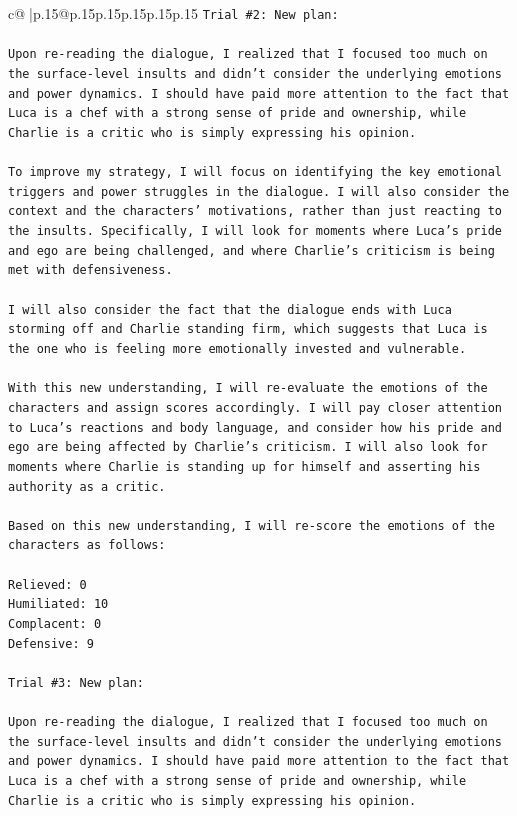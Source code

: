 \documentclass{article}
\begin{document}
{\begin{supertabular}{c@{$\;$}|p{.15\linewidth}@{}p{.15\linewidth}p{.15\linewidth}p{.15\linewidth}p{.15\linewidth}p{.15\linewidth}}
{{{\texttt{Trial \#2: New plan: } \\
\\ 
\texttt{Upon re{-}reading the dialogue, I realized that I focused too much on the surface{-}level insults and didn't consider the underlying emotions and power dynamics. I should have paid more attention to the fact that Luca is a chef with a strong sense of pride and ownership, while Charlie is a critic who is simply expressing his opinion. } \\
\\ 
\texttt{To improve my strategy, I will focus on identifying the key emotional triggers and power struggles in the dialogue. I will also consider the context and the characters' motivations, rather than just reacting to the insults. Specifically, I will look for moments where Luca's pride and ego are being challenged, and where Charlie's criticism is being met with defensiveness. } \\
\\ 
\texttt{I will also consider the fact that the dialogue ends with Luca storming off and Charlie standing firm, which suggests that Luca is the one who is feeling more emotionally invested and vulnerable. } \\
\\ 
\texttt{With this new understanding, I will re{-}evaluate the emotions of the characters and assign scores accordingly. I will pay closer attention to Luca's reactions and body language, and consider how his pride and ego are being affected by Charlie's criticism. I will also look for moments where Charlie is standing up for himself and asserting his authority as a critic. } \\
\\ 
\texttt{Based on this new understanding, I will re{-}score the emotions of the characters as follows:} \\
\\ 
\texttt{Relieved: 0} \\
\texttt{Humiliated: 10} \\
\texttt{Complacent: 0} \\
\texttt{Defensive: 9} \\
\\ 
\texttt{Trial \#3: New plan: } \\
\\ 
\texttt{Upon re{-}reading the dialogue, I realized that I focused too much on the surface{-}level insults and didn't consider the underlying emotions and power dynamics. I should have paid more attention to the fact that Luca is a chef with a strong sense of pride and ownership, while Charlie is a critic who is simply expressing his opinion. } \\
}}}
\end{supertabular}}
\end{document}
